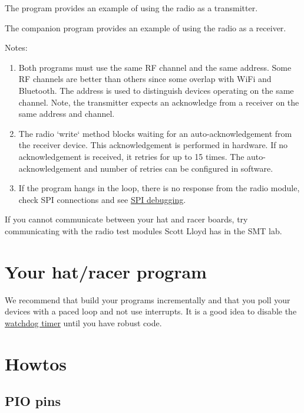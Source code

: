 The program  provides
an example of using the radio as a transmitter.

The companion program
 provides an example
of using the radio as a receiver.

Notes:
%
\begin{enumerate}
\item
  Both programs must use the same RF channel and the same address. Some
  RF channels are better than others since some overlap with WiFi
  and Bluetooth. The address is used to distinguish devices
  operating on the same channel. Note, the transmitter expects an
  acknowledge from a receiver on the same address and channel.
\item
  The radio `write` method blocks waiting for an auto-acknowledgement
  from the receiver device. This acknowledgement is performed in
  hardware. If no acknowledgement is received, it retries for up to 15
  times. The auto-acknowledgement and number of retries can be
  configured in software.

\item If the program hangs in the  loop, there is no
  response from the radio module, check SPI connections and see
  \hyperref[debugging_Spi]{SPI debugging}.
  
\end{enumerate}

If you cannot communicate between your hat and racer boards, try
communicating with the radio test modules Scott Lloyd has in the SMT
lab.

\section{Your hat/racer program}
\label{your-hatracer-program}

We recommend that build your programs incrementally and that you poll
your devices with a paced loop and not use interrupts.  It is a good
idea to disable the \hyperref[watchdog-timer]{watchdog timer} until
you have robust code.

\section{Howtos}
\label{howtos}

\subsection{PIO pins}

